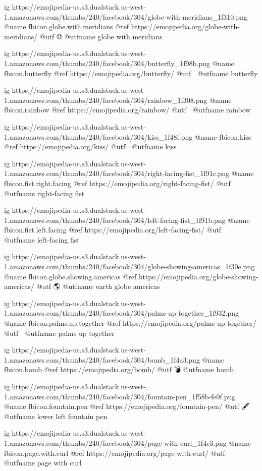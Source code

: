 	ig https://emojipedia-us.s3.dualstack.us-west-1.amazonaws.com/thumbs/240/facebook/304/globe-with-meridians_1f310.png
	@name fbicon.globe.with.meridians
	@ref https://emojipedia.org/globe-with-meridians/
	@utf 🌐
	@utfname globe with meridians

	ig https://emojipedia-us.s3.dualstack.us-west-1.amazonaws.com/thumbs/240/facebook/304/butterfly_1f98b.png
	@name fbicon.butterfly
	@ref https://emojipedia.org/butterfly/
	@utf 🦋
	@utfname butterfly

	ig https://emojipedia-us.s3.dualstack.us-west-1.amazonaws.com/thumbs/240/facebook/304/rainbow_1f308.png
	@name fbicon.rainbow
	@ref https://emojipedia.org/rainbow/
	@utf 🌈
	@utfname rainbow

	ig https://emojipedia-us.s3.dualstack.us-west-1.amazonaws.com/thumbs/240/facebook/304/kiss_1f48f.png
	@name fbicon.kiss
	@ref https://emojipedia.org/kiss/
	@utf 💏
	@utfname kiss

	ig https://emojipedia-us.s3.dualstack.us-west-1.amazonaws.com/thumbs/240/facebook/304/right-facing-fist_1f91c.png
	@name fbicon.fist.right.facing
	@ref https://emojipedia.org/right-facing-fist/
	@utf 🤜
	@utfname right-facing fist

	ig https://emojipedia-us.s3.dualstack.us-west-1.amazonaws.com/thumbs/240/facebook/304/left-facing-fist_1f91b.png
	@name fbicon.fist.left.facing
	@ref https://emojipedia.org/left-facing-fist/
	@utf 🤛
	@utfname left-facing fist

	ig https://emojipedia-us.s3.dualstack.us-west-1.amazonaws.com/thumbs/240/facebook/304/globe-showing-americas_1f30e.png
	@name fbicon.globe.showing.americas
	@ref https://emojipedia.org/globe-showing-americas/
	@utf 🌎
	@utfname earth globe americas

	ig https://emojipedia-us.s3.dualstack.us-west-1.amazonaws.com/thumbs/240/facebook/304/palms-up-together_1f932.png
	@name fbicon.palms.up.together
	@ref https://emojipedia.org/palms-up-together/
	@utf 🤲
	@utfname palms up together

	ig https://emojipedia-us.s3.dualstack.us-west-1.amazonaws.com/thumbs/240/facebook/304/bomb_1f4a3.png
	@name fbicon.bomb
	@ref https://emojipedia.org/bomb/
	@utf 💣
	@utfname bomb

	ig https://emojipedia-us.s3.dualstack.us-west-1.amazonaws.com/thumbs/240/facebook/304/fountain-pen_1f58b-fe0f.png
	@name fbicon.fountain.pen
	@ref https://emojipedia.org/fountain-pen/
	@utf 🖋
	@utfname lower left fountain pen

	ig https://emojipedia-us.s3.dualstack.us-west-1.amazonaws.com/thumbs/240/facebook/304/page-with-curl_1f4c3.png
	@name fbicon.page.with.curl
	@ref https://emojipedia.org/page-with-curl/
	@utf 📃
	@utfname page with curl

